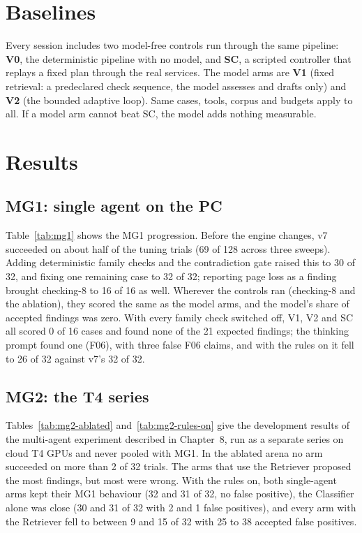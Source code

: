 \section{Baselines}
Every session includes two model-free controls run through the same pipeline: \textbf{V0}, the
deterministic pipeline with no model, and \textbf{SC}, a scripted controller that replays a fixed
plan through the real services. The model arms are \textbf{V1} (fixed retrieval: a predeclared
check sequence, the model assesses and drafts only) and \textbf{V2} (the bounded adaptive loop).
Same cases, tools, corpus and budgets apply to all. If a model arm cannot beat SC, the model adds
nothing measurable.

\section{Results}

\subsection{MG1: single agent on the PC}
Table~\ref{tab:mg1} shows the MG1 progression. Before the engine changes, v7 succeeded on about
half of the tuning trials (69 of 128 across three sweeps). Adding deterministic family checks and
the contradiction gate raised this to 30 of 32, and fixing one remaining case to 32 of 32; reporting
page loss as a finding brought checking-8 to 16 of 16 as well. Wherever the controls ran
(checking-8 and the ablation), they scored the same as the model arms, and the model's share of
accepted findings was zero.
With every family check switched off, V1, V2 and SC all scored 0 of 16 cases and found none of the
21 expected findings; the thinking prompt found one (F06), with three false F06 claims, and with
the rules on it fell to 26 of 32 against v7's 32 of 32.



\subsection{MG2: the T4 series}
Tables~\ref{tab:mg2-ablated} and~\ref{tab:mg2-rules-on} give the development results of the
multi-agent experiment described in Chapter~8, run as a separate series on cloud T4 GPUs and never
pooled with MG1. In the ablated arena no arm succeeded on more than 2 of 32 trials. The arms that
use the Retriever proposed the most findings, but most were wrong. With the rules on, both
single-agent arms kept their MG1 behaviour (32 and 31 of 32, no false positive), the Classifier
alone was close (30 and 31 of 32 with 2 and 1 false positives), and every arm with the Retriever
fell to between 9 and 15 of 32 with 25 to 38 accepted false positives.


